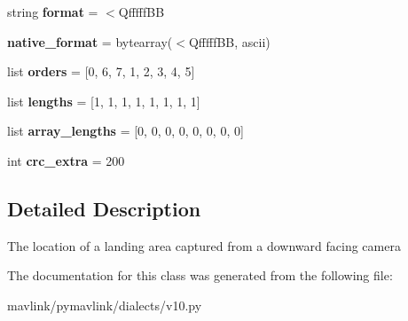 \begin{DoxyCompactItemize}
string {\bfseries format} = \textquotesingle{}$<$Qfffff\+BB\textquotesingle{}
\item 
\mbox{\label{classpymavlink_1_1dialects_1_1v10_1_1MAVLink__landing__target__message_a0ac9e6ca71cc0d86d6d712139a0f3ab9}} 
{\bfseries native\+\_\+format} = bytearray(\textquotesingle{}$<$Qfffff\+BB\textquotesingle{}, \textquotesingle{}ascii\textquotesingle{})
\item 
\mbox{\label{classpymavlink_1_1dialects_1_1v10_1_1MAVLink__landing__target__message_a50495d2ec1bc98d2fbb85039830bd33b}} 
list {\bfseries orders} = \mbox{[}0, 6, 7, 1, 2, 3, 4, 5\mbox{]}
\item 
\mbox{\label{classpymavlink_1_1dialects_1_1v10_1_1MAVLink__landing__target__message_ae130284e9ac417f082009941fb57c664}} 
list {\bfseries lengths} = \mbox{[}1, 1, 1, 1, 1, 1, 1, 1\mbox{]}
\item 
\mbox{\label{classpymavlink_1_1dialects_1_1v10_1_1MAVLink__landing__target__message_a20d441b98a50f52103e409853675c4d7}} 
list {\bfseries array\+\_\+lengths} = \mbox{[}0, 0, 0, 0, 0, 0, 0, 0\mbox{]}
\item 
\mbox{\label{classpymavlink_1_1dialects_1_1v10_1_1MAVLink__landing__target__message_a562e90f5d70d5c54f6cf0702d5b071f2}} 
int {\bfseries crc\+\_\+extra} = 200
\end{DoxyCompactItemize}


\subsection{Detailed Description}
\begin{DoxyVerb}The location of a landing area captured from a downward facing
camera
\end{DoxyVerb}
 

The documentation for this class was generated from the following file\+:\begin{DoxyCompactItemize}
\item 
mavlink/pymavlink/dialects/v10.\+py\end{DoxyCompactItemize}
